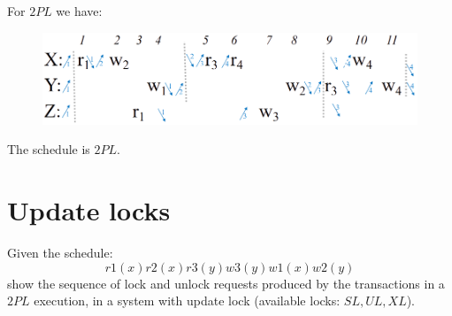 \documentclass[12pt, a4paper]{report}
\newtheorem[style=M,bodystyle=\normalfont]{theorem}{Theorem}
\newtheorem[style=M,bodystyle=\normalfont]{corollary}{Corollary}
\newtheorem[style=M,bodystyle=\normalfont]{lemma}{Lemma}
\newtheorem[style=M,bodystyle=\normalfont]{definition}{Definition}
\begin{document}
        For $2PL$ we have: 
        \begin{figure}[H]
            \centering
            \includegraphics[width=1\linewidth]{images/2PL8.png}
        \end{figure}
        The schedule is $2PL$. 

    \newpage

    \section{Update locks}
        Given the schedule:
        \[r1(x) r2(x) r3(y) w3(y) w1(x) w2(y)\]
        show the sequence of lock and unlock requests produced by the transactions in a $2PL$ execution, in a system with update lock (available locks: $SL, UL, XL$).
\end{document}
